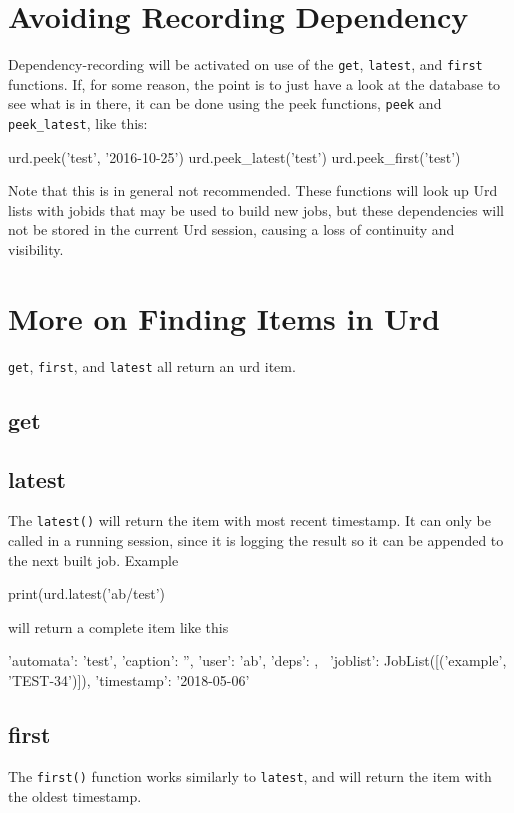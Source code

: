 \section{Avoiding Recording Dependency}
Dependency-recording will be activated on use of the \texttt{get},
\texttt{latest}, and \texttt{first} functions.  If, for some reason,
the point is to just have a look at the database to see what is in
there, it can be done using the peek functions, \texttt{peek} and
\texttt{peek\_latest}, like this:
\begin{python}
    urd.peek('test', '2016-10-25')
    urd.peek_latest('test')
    urd.peek_first('test')
\end{python}
Note that this is in general not recommended.  These functions will
look up Urd lists with jobids that may be used to build new jobs, but
these dependencies will not be stored in the current Urd session,
causing a loss of continuity and visibility.



\section{More on Finding Items in Urd}
\texttt{get}, \texttt{first}, and \texttt{latest} all return an urd item.


\subsection{get}



\subsection{latest}
The \texttt{latest()} will return the item with most recent timestamp.
It can only be called in a running session, since it is logging the
result so it can be appended to the next built job.  Example
\begin{python}
print(urd.latest('ab/test')
\end{python}
will return a complete item like this
\begin{shell}
{'automata': 'test', 'caption': '', 'user': 'ab', 'deps': {}, \
 'joblist': JobList([('example', 'TEST-34')]), 'timestamp': '2018-05-06'}
\end{shell}


\subsection{first}
The \texttt{first()} function works similarly to \texttt{latest}, and
will return the item with the oldest timestamp.


